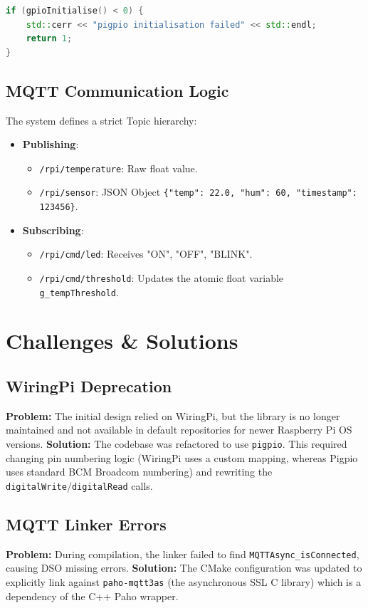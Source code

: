 \documentclass[12pt, a4paper]{article}
\begin{document}
\begin{lstlisting}[language=C++, caption=Pigpio Initialization]
if (gpioInitialise() < 0) {
    std::cerr << "pigpio initialisation failed" << std::endl;
    return 1;
}
\end{lstlisting}

\subsection{MQTT Communication Logic}
The system defines a strict Topic hierarchy:
\begin{itemize}
    \item \textbf{Publishing}:
        \begin{itemize}
            \item \texttt{/rpi/temperature}: Raw float value.
            \item \texttt{/rpi/sensor}: JSON Object \texttt{\{"temp": 22.0, "hum": 60, "timestamp": 123456\}}.
        \end{itemize}
    \item \textbf{Subscribing}:
        \begin{itemize}
            \item \texttt{/rpi/cmd/led}: Receives "ON", "OFF", "BLINK".
            \item \texttt{/rpi/cmd/threshold}: Updates the atomic float variable \texttt{g\_tempThreshold}.
        \end{itemize}
\end{itemize}

\newpage

\section{Challenges & Solutions}

\subsection{WiringPi Deprecation}
\textbf{Problem:} The initial design relied on WiringPi, but the library is no longer maintained and not available in default repositories for newer Raspberry Pi OS versions.
\textbf{Solution:} The codebase was refactored to use \texttt{pigpio}. This required changing pin numbering logic (WiringPi uses a custom mapping, whereas Pigpio uses standard BCM Broadcom numbering) and rewriting the \texttt{digitalWrite}/\texttt{digitalRead} calls.

\subsection{MQTT Linker Errors}
\textbf{Problem:} During compilation, the linker failed to find \texttt{MQTTAsync\_isConnected}, causing DSO missing errors.
\textbf{Solution:} The CMake configuration was updated to explicitly link against \texttt{paho-mqtt3as} (the asynchronous SSL C library) which is a dependency of the C++ Paho wrapper.
\end{document}

